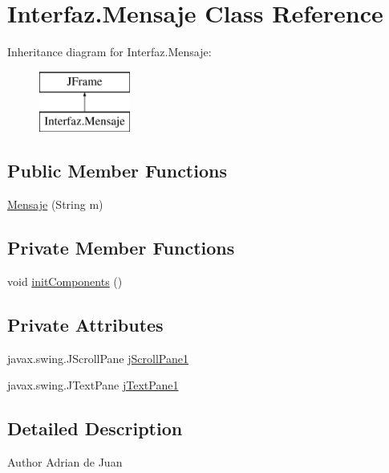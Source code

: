 \hypertarget{class_interfaz_1_1_mensaje}{}\section{Interfaz.\+Mensaje Class Reference}
\label{class_interfaz_1_1_mensaje}
Inheritance diagram for Interfaz.\+Mensaje\+:\begin{figure}[H]
\begin{center}
\leavevmode
\includegraphics[height=2.000000cm]{class_interfaz_1_1_mensaje}
\end{center}
\end{figure}
\subsection*{Public Member Functions}
\begin{DoxyCompactItemize}
\item 
\mbox{\hyperlink{class_interfaz_1_1_mensaje_a2206473aa776a341267e31c9c132c733}{Mensaje}} (String m)
\end{DoxyCompactItemize}
\subsection*{Private Member Functions}
\begin{DoxyCompactItemize}
\item 
void \mbox{\hyperlink{class_interfaz_1_1_mensaje_a1d01f1253c5cce9770a855f6cd81915b}{init\+Components}} ()
\end{DoxyCompactItemize}
\subsection*{Private Attributes}
\begin{DoxyCompactItemize}
\item 
javax.\+swing.\+J\+Scroll\+Pane \mbox{\hyperlink{class_interfaz_1_1_mensaje_a7da6f30c05a1006cde5b42ccfb671ee9}{j\+Scroll\+Pane1}}
\item 
javax.\+swing.\+J\+Text\+Pane \mbox{\hyperlink{class_interfaz_1_1_mensaje_abbd0afdc912a7465ded350b063ae1a4e}{j\+Text\+Pane1}}
\end{DoxyCompactItemize}


\subsection{Detailed Description}
\begin{DoxyAuthor}{Author}
Adrian de Juan 
\end{DoxyAuthor}


